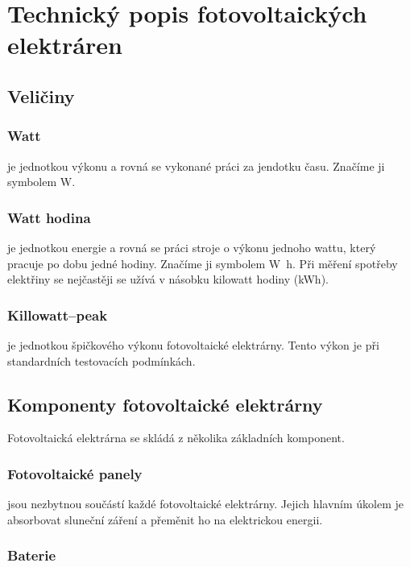\section{Technický popis fotovoltaických elektráren}

\subsection{Veličiny}

\subsubsection{Watt} je jednotkou výkonu a rovná se vykonané práci za jendotku času.
Značíme ji symbolem \si{\watt}.

\subsubsection{Watt hodina} je jednotkou energie a rovná se práci stroje o výkonu jednoho wattu, který pracuje po dobu jedné hodiny.
Značíme ji symbolem \si{\watt\hour}. Při měření spotřeby elektřiny se nejčastěji se užívá v násobku kilowatt hodiny (\si{\kWh}).

\subsubsection{Killowatt--peak} je jednotkou špičkového výkonu fotovoltaické elektrárny. Tento výkon je při standardních testovacích podmínkách.


\subsection{Komponenty fotovoltaické elektrárny}
Fotovoltaická elektrárna se skládá z několika základních komponent.

\subsubsection{Fotovoltaické panely}

jsou nezbytnou součástí každé fotovoltaické elektrárny.
Jejich hlavním úkolem je absorbovat sluneční záření a přeměnit ho na elektrickou energii.

\subsubsection{Baterie}

